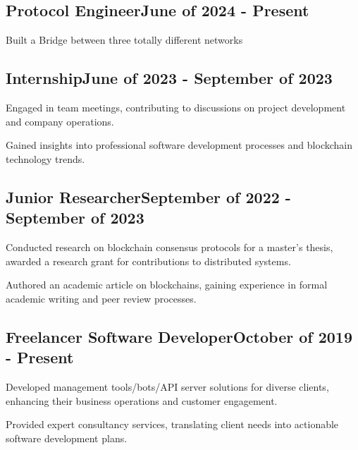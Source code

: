 \documentclass[a4paper,12pt]{article}
\begin{document}

\vspace*{6pt}
\subsection{{Protocol Engineer}\hfill June of 2024 - Present}
\begin{zitemize}
    \item Built a Bridge between three totally different networks
\end{zitemize}


\vspace*{3pt}
\subsection{{Internship}\hfill June of 2023 - September of 2023}
\begin{zitemize}
    \item Engaged in team meetings, contributing to discussions on project development and company operations.
    \item Gained insights into professional software development processes and blockchain technology trends.
\end{zitemize}

\vspace*{1pt} 
\subsection{{Junior Researcher}\hfill September of 2022 - September of 2023}
\begin{zitemize}
    \item Conducted research on blockchain consensus protocols for a master's thesis, awarded a research grant for contributions to distributed systems.
    \item Authored an academic article on blockchains, gaining experience in formal academic writing and peer review processes.
\end{zitemize}

\vspace*{1pt} 
\subsection{{Freelancer Software Developer}\hfill October of 2019 - Present}
\begin{zitemize}
\item Developed management tools/bots/API server solutions for diverse clients, enhancing their business operations and customer engagement.
\item Provided expert consultancy services, translating client needs into actionable software development plans.
\end{zitemize}
\end{document}
